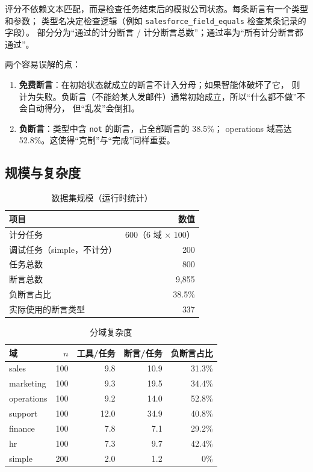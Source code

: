 \documentclass[UTF8,a4paper,11pt]{ctexart}
\begin{document}
评分不依赖文本匹配，而是检查任务结束后的模拟公司状态。每条断言有一个类型和参数；
类型名决定检查逻辑（例如 \texttt{salesforce\_field\_equals} 检查某条记录的字段）。
部分分为“通过的计分断言 / 计分断言总数”；通过率为“所有计分断言都通过”。

两个容易误解的点：

\begin{enumerate}
  \item \textbf{免费断言}：在初始状态就成立的断言不计入分母；如果智能体破坏了它，
  则计为失败。负断言（不能给某人发邮件）通常初始成立，所以“什么都不做”不会自动得分，
  但“乱发”会倒扣。
  \item \textbf{负断言}：类型中含 \texttt{not} 的断言，占全部断言的 38.5\%；
  operations 域高达 52.8\%。这使得“克制”与“完成”同样重要。
\end{enumerate}

\subsection{规模与复杂度}

\begin{table}[htbp]
\centering
\caption{数据集规模（运行时统计）}
\begin{tabular}{lr}
\toprule
项目 & 数值 \\
\midrule
计分任务 & 600（6 域 $\times$ 100） \\
调试任务（simple，不计分） & 200 \\
任务总数 & 800 \\
断言总数 & 9,855 \\
负断言占比 & 38.5\% \\
实际使用的断言类型 & 337 \\
\bottomrule
\end{tabular}
\end{table}

\begin{table}[htbp]
\centering
\caption{分域复杂度}
\begin{tabular}{lrrrr}
\toprule
域 & $n$ & 工具/任务 & 断言/任务 & 负断言占比 \\
\midrule
sales & 100 & 9.8 & 10.9 & 31.3\% \\
marketing & 100 & 9.3 & 19.5 & 34.4\% \\
operations & 100 & 9.2 & 14.0 & 52.8\% \\
support & 100 & 12.0 & 34.9 & 40.8\% \\
finance & 100 & 7.8 & 7.1 & 29.2\% \\
hr & 100 & 7.3 & 9.7 & 42.4\% \\
simple & 200 & 2.0 & 1.2 & 0\% \\
\bottomrule
\end{tabular}
\end{table}
\end{document}
